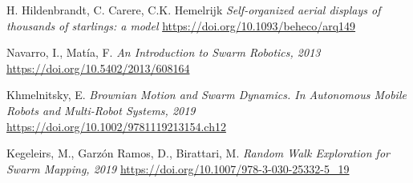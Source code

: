 \documentclass[12pt]{article}
\begin{document}
\begin{thebibliography}{9}

    H. Hildenbrandt, C. Carere, C.K. Hemelrijk
    \textit{Self-organized aerial displays of thousands of starlings: a model}
    \href{https://doi.org/10.1093/beheco/arq149}{https://doi.org/10.1093/beheco/arq149}

    Navarro, I., Matía, F.
    \textit{An Introduction to Swarm Robotics, 2013}
    \href{https://doi.org/10.5402/2013/608164}{https://doi.org/10.5402/2013/608164}

    Khmelnitsky, E.
    \textit{Brownian Motion and Swarm Dynamics. In Autonomous Mobile Robots and Multi-Robot Systems, 2019}
    \href{https://doi.org/10.1002/9781119213154.ch12}{https://doi.org/10.1002/9781119213154.ch12}

    Kegeleirs, M., Garzón Ramos, D., Birattari, M.
    \textit{Random Walk Exploration for Swarm Mapping, 2019}
    \href{https://doi.org/10.1007/978-3-030-25332-5_19}{https://doi.org/10.1007/978-3-030-25332-5_19}

\end{thebibliography}
\end{document}
